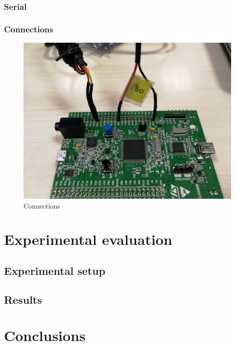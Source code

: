 \subsubsection{Serial}

\subsubsection{Connections}

\cite{RefManual}
\begin{figure}[htbp]
  \centering
     \includegraphics[width=1\textwidth]{./figures/connections.jpg}
  \caption{Connections}
  \label{fig:connections}
\end{figure}

\section{Experimental evaluation}\label{Results}
\subsection{Experimental setup}
\subsection{Results}

\section{Conclusions}
